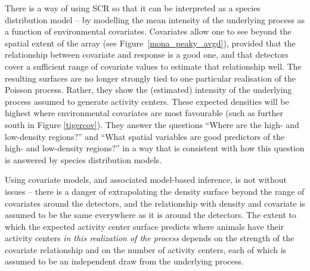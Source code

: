 \documentclass[10pt,a4paper]{article}
\begin{document}
There is a way of using SCR so that it can be interpreted as a species distribution model -- by modelling the mean intensity of the underlying process as a function of environmental covariates. Covariates allow one to see beyond the spatial extent of the array (see Figure~\ref{mona_peaky_avgd}), provided that the relationship between covariate and response is a good one, and that detectors cover a sufficient range of covariate values to estimate that relationship well. The resulting surfaces are no longer strongly tied to one particular realisation of the Poisson process. Rather, they show the (estimated) intensity of the underlying process assumed to generate activity centers. These expected densities will be highest where environmental covariates are most favourable (such as further south in Figure \ref{tigercov}). They  answer the questions ``Where are the high- and low-density regions?'' and ``What spatial variables are good predictors of the high- and low-density regions?'' in a way that is consistent with how this question is answered by species distribution models. %

Using covariate models, and associated model-based inference, is not without issues -- there is a danger of extrapolating the density surface beyond the range of covariates around the detectors, and the relationship with density and covariate is assumed to be the same everywhere as it is around the detectors. The extent to which the expected activity center surface predicts where animals have their activity centers {\it in this realization of the process} depends on the strength of the covariate relationship and on the number of activity centers, each of which is assumed to be an independent draw from the underlying process. %
\end{document}
